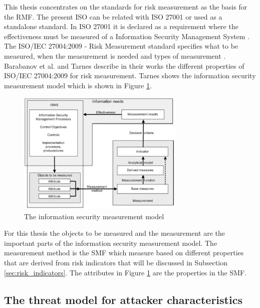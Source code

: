 This thesis concentrates on the standards for risk measurement as the basis for the RMF. The present ISO can be related with ISO 27001 or used as a standalone standard. In ISO 27001
it is declared as a requirement where the effectiveness must be measured of a Information Security Management System \cite{barabanov2011information}. The ISO/IEC 27004:2009 - Risk
Measurement standard specifies what to be measured, when the measurement is needed and types of measurement \cite{lundholm2011design}. Barabanov et al. \cite{barabanov2011information} and
Tarnes \cite{tarnes2012information} describe in their works the different properties of ISO/IEC 27004:2009 for risk measurement. Tarnes shows the information security measurement model
which is shown in Figure \ref{fig:is_measurement_model}.

\begin{figure}[ht!]
  \centering
  \includegraphics[width=8cm]{pictures/is_measurement_model.jpg}
  \caption{The information security measurement model \cite{tarnes2012information}}
  \label{fig:is_measurement_model}
\end{figure}

For this thesis the objects to be measured and the measurement are the important parts of the information security measurement model. The measurement method is the SMF which measure based
on different properties that are derived from risk indicators that will be discussed in Subsection \ref{sec:risk_indicators}. The attributes in Figure \ref{fig:is_measurement_model} are
the properties in the SMF.

\subsection{The threat model for attacker characteristics}
\label{sec:threat}

